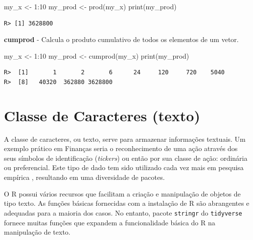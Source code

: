 \documentclass[
  11pt,
]{book}
\newenvironment{Shaded}{\begin{snugshade}}{\end{snugshade}}
\newcommand{\DecValTok}[1]{\textcolor[rgb]{0.06,0.06,0.06}{#1}}
\newcommand{\FunctionTok}[1]{\textcolor[rgb]{0,0,0}{#1}}
\newcommand{\NormalTok}[1]{#1}
\newcommand{\OtherTok}[1]{\textcolor[rgb]{0.37,0.37,0.37}{#1}}
\newcommand{\SpecialCharTok}[1]{\textcolor[rgb]{0,0,0}{#1}}
\begin{document}
\begin{Shaded}
\begin{Highlighting}[]
\NormalTok{my\_x }\OtherTok{\textless{}{-}} \DecValTok{1}\SpecialCharTok{:}\DecValTok{10}
\NormalTok{my\_prod }\OtherTok{\textless{}{-}} \FunctionTok{prod}\NormalTok{(my\_x)}
\FunctionTok{print}\NormalTok{(my\_prod)}
\end{Highlighting}
\end{Shaded}

\begin{verbatim}
R> [1] 3628800
\end{verbatim}

\textbf{cumprod} - Calcula o produto cumulativo de todos os elementos de um vetor.

\begin{Shaded}
\begin{Highlighting}[]
\NormalTok{my\_x }\OtherTok{\textless{}{-}} \DecValTok{1}\SpecialCharTok{:}\DecValTok{10}
\NormalTok{my\_prod }\OtherTok{\textless{}{-}} \FunctionTok{cumprod}\NormalTok{(my\_x)}
\FunctionTok{print}\NormalTok{(my\_prod)}
\end{Highlighting}
\end{Shaded}

\begin{verbatim}
R>  [1]       1       2       6      24     120     720    5040
R>  [8]   40320  362880 3628800
\end{verbatim}

\hypertarget{classe-de-caracteres-texto}{%
\section{Classe de Caracteres (texto)}\label{classe-de-caracteres-texto}}

A classe de caracteres, ou texto, serve para armazenar informações textuais. Um exemplo prático em Finanças seria o reconhecimento de uma ação através dos seus símbolos de identificação (\emph{tickers}) ou então por sua classe de ação: ordinária ou preferencial. Este tipo de dado tem sido utilizado cada vez mais em pesquisa empírica \citep{gentzkow2017text}, resultando em uma diversidade de pacotes.

O R possui vários recursos que facilitam a criação e manipulação de objetos de tipo texto. As funções básicas fornecidas com a instalação de R são abrangentes e adequadas para a maioria dos casos. No entanto, pacote \texttt{stringr} \citep{R-stringr} do \texttt{tidyverse} fornece muitas funções que expandem a funcionalidade básica do R na manipulação de texto.
\end{document}
